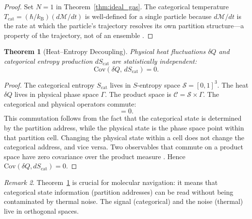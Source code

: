 \documentclass[11pt,twocolumn,a4paper]{article}
\theoremstyle{plain}
\newtheorem{theorem}{Theorem}[section]
\theoremstyle{definition}
\theoremstyle{remark}
\newtheorem{remark}[theorem]{Remark}
\newcommand{\Scat}{S_{\mathrm{cat}}}
\newcommand{\kB}{k_{\mathrm{B}}}
\newcommand{\Ocat}{\hat{O}_{\mathrm{cat}}}
\newcommand{\Ophys}{\hat{O}_{\mathrm{phys}}}
\newcommand{\Tcat}{T_{\mathrm{cat}}}
\newcommand{\Depth}{\mathcal{M}}
\newcommand{\Sspace}{\mathcal{S}}
\newcommand{\Cat}{\mathcal{C}}
\begin{document}
\begin{proof}
Set $N = 1$ in Theorem~\ref{thm:ideal_gas}. The categorical temperature $\Tcat = (\hbar/\kB)(d\Depth/dt)$ is well-defined for a single particle because $d\Depth/dt$ is the rate at which the particle's trajectory resolves its own partition structure---a property of the trajectory, not of an ensemble \cite{sachikonye2026single, sachikonye2026gas}.
\end{proof}

\begin{theorem}[Heat--Entropy Decoupling]
\label{thm:decoupling}
Physical heat fluctuations $\delta Q$ and categorical entropy production $d\Scat$ are statistically independent:
\begin{equation}
\mathrm{Cov}(\delta Q, \, d\Scat) = 0.
\label{eq:decoupling}
\end{equation}
\end{theorem}

\begin{proof}
The categorical entropy $\Scat$ lives in $S$-entropy space $\Sspace = [0,1]^3$. The heat $\delta Q$ lives in physical phase space $\Gamma$. The product space is $\Cat = \Sspace \times \Gamma$. The categorical and physical operators commute:
\begin{equation}
[\Ocat, \Ophys] = 0.
\label{eq:commutation}
\end{equation}
This commutation follows from the fact that the categorical state is determined by the partition address, while the physical state is the phase space point within that partition cell. Changing the physical state within a cell does not change the categorical address, and vice versa. Two observables that commute on a product space have zero covariance over the product measure \cite{sachikonye2026instrument}. Hence $\mathrm{Cov}(\delta Q, d\Scat) = 0$.
\end{proof}

\begin{remark}
Theorem~\ref{thm:decoupling} is crucial for molecular navigation: it means that categorical state information (partition addresses) can be read without being contaminated by thermal noise. The signal (categorical) and the noise (thermal) live in orthogonal spaces.
\end{remark}


\end{document}
